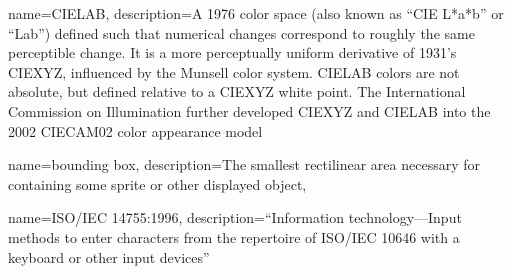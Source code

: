 {
  name={CIELAB},
  description={A 1976 color space (also known as ``CIE L*a*b'' or ``Lab'') defined such that
  numerical changes correspond to roughly the same perceptible change. It is
  a more perceptually uniform derivative of 1931's CIEXYZ, influenced by the
  Munsell color system. CIELAB colors are not absolute, but defined relative
  to a CIEXYZ white point. The International Commission on Illumination further
  developed CIEXYZ and CIELAB into the 2002 CIECAM02 color appearance model}
}

{
  name={bounding box},
  description={The smallest rectilinear area necessary for containing some
    sprite or other displayed object},
}

{
  name={ISO/IEC 14755:1996},
  description={``Information technology---Input methods to enter characters from the repertoire of ISO/IEC 10646 with a
    keyboard or other input devices''}
}

